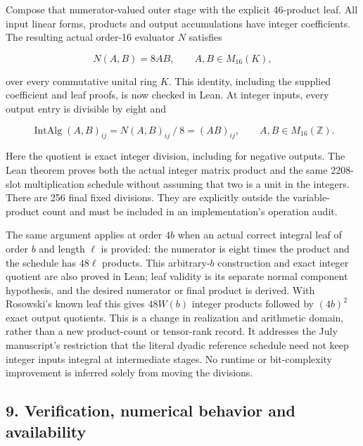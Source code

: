 \documentclass[
  11pt,
]{article}
\begin{document}
Compose that numerator-valued outer stage with the explicit 46-product
leaf. All input linear forms, products and output accumulations have
integer coefficients. The resulting actual order-16 evaluator \(N\)
satisfies

\[
N(A,B)=8AB,
\qquad A,B\in M_{16}(K),
\tag{13}
\]

over every commutative unital ring \(K\). This identity, including the
supplied coefficient and leaf proofs, is now checked in Lean. At integer
inputs, every output entry is divisible by eight and

\[
\operatorname{IntAlg}(A,B)_{ij}=N(A,B)_{ij}\mathbin{/}8=(AB)_{ij},
\qquad A,B\in M_{16}(\mathbb Z).
\tag{14}
\]

Here the quotient is exact integer division, including for negative
outputs. The Lean theorem proves both the actual integer matrix product
and the same 2208-slot multiplication schedule without assuming that two
is a unit in the integers. There are 256 final fixed divisions. They are
explicitly outside the variable-product count and must be included in an
implementation's operation audit.

The same argument applies at order \(4b\) when an actual correct
integral leaf of order \(b\) and length \(\ell\) is provided: the
numerator is eight times the product and the schedule has \(48\ell\)
products. This arbitrary-\(b\) construction and exact integer quotient
are also proved in Lean; leaf validity is its separate normal component
hypothesis, and the desired numerator or final product is derived. With
Rosowski's known leaf this gives \(48W(b)\) integer products followed by
\((4b)^2\) exact output quotients. This is a change in realization and
arithmetic domain, rather than a new product-count or tensor-rank
record. It addresses the July manuscript's restriction that the literal
dyadic reference schedule need not keep integer inputs integral at
intermediate stages. No runtime or bit-complexity improvement is
inferred solely from moving the divisions.

\subsection{9. Verification, numerical behavior and
availability}\label{verification-numerical-behavior-and-availability}
\end{document}
